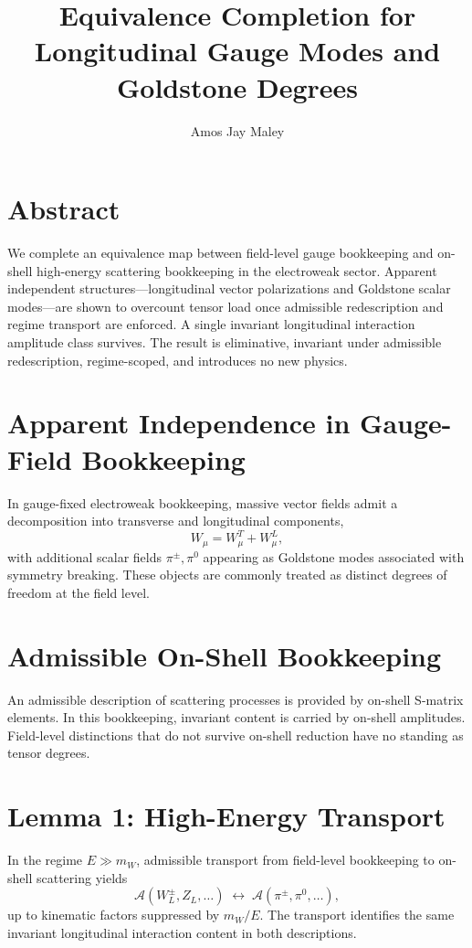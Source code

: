 ﻿\documentclass[11pt]{article}
\title{Equivalence Completion for Longitudinal Gauge Modes and Goldstone Degrees}
\author{Amos Jay Maley}
\date{}
\begin{document}
\maketitle

\section*{Abstract}
We complete an equivalence map between field-level gauge bookkeeping and on-shell high-energy scattering bookkeeping in the electroweak sector. Apparent independent structures—longitudinal vector polarizations and Goldstone scalar modes—are shown to overcount tensor load once admissible redescription and regime transport are enforced. A single invariant longitudinal interaction amplitude class survives. The result is eliminative, invariant under admissible redescription, regime-scoped, and introduces no new physics.

\section{Apparent Independence in Gauge-Field Bookkeeping}
In gauge-fixed electroweak bookkeeping, massive vector fields admit a decomposition into transverse and longitudinal components,
\begin{equation}
W_\mu = W_\mu^{T} + W_\mu^{L},
\end{equation}
with additional scalar fields $\pi^\pm,\pi^0$ appearing as Goldstone modes associated with symmetry breaking. These objects are commonly treated as distinct degrees of freedom at the field level.

\section{Admissible On-Shell Bookkeeping}
An admissible description of scattering processes is provided by on-shell S-matrix elements. In this bookkeeping, invariant content is carried by on-shell amplitudes. Field-level distinctions that do not survive on-shell reduction have no standing as tensor degrees.

\section{Lemma 1: High-Energy Transport}
In the regime $E \gg m_W$, admissible transport from field-level bookkeeping to on-shell scattering yields
\begin{equation}
\mathcal{A}(W_L^\pm, Z_L, \ldots)
\;\longleftrightarrow\;
\mathcal{A}(\pi^\pm, \pi^0, \ldots),
\end{equation}
up to kinematic factors suppressed by $m_W/E$. The transport identifies the same invariant longitudinal interaction content in both descriptions.
\end{document}
